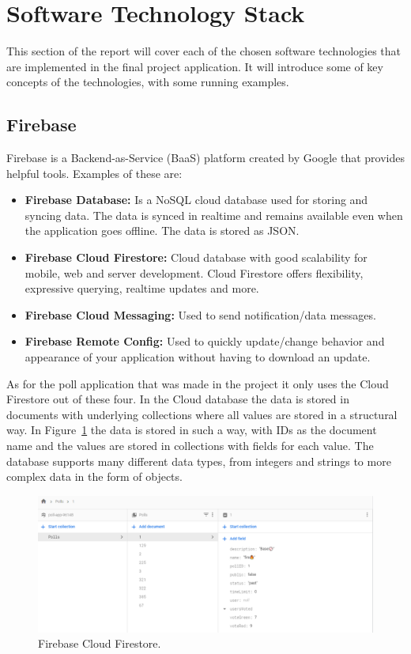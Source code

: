\section{Software Technology Stack}
\label{sec:technology}

This section of the report will cover each of the chosen software technologies that are implemented in the final project application. It will introduce some of key concepts of the technologies, with some running examples. 

\subsection{Firebase}
\label{sub:firebase}
Firebase is a Backend-as-Service (BaaS) platform created by Google that provides helpful tools. Examples of these are:

\begin{itemize}
 \item \textbf{Firebase Database:} Is a NoSQL cloud database used for storing and syncing data. The data is synced in realtime and remains available even when the application goes offline. The data is stored as JSON. \cite{firebasedb}
 \item \textbf{Firebase Cloud Firestore:} Cloud database with good scalability for mobile, web and server development. Cloud Firestore offers flexibility, expressive querying, realtime updates and more. \cite{firebasefs}
 \item \textbf{Firebase Cloud Messaging:} Used to send notification/data messages. \cite{firebasecm}
 \item \textbf{Firebase Remote Config:} Used to quickly update/change behavior and appearance of your application without having to download an update. \cite{firebaserc}
\end{itemize}
As for the poll application that was made in the project it only uses the Cloud Firestore out of these four. In the Cloud database the data is stored in documents with underlying collections where all values are stored in a structural way. In Figure~\ref{fig:fb} the data is stored in such a way, with IDs as the document name and the values are stored in collections with fields for each value. The database supports many different data types, from integers and strings to more complex data in the form of objects.
\begin{figure}[H]
  \centering
  \includegraphics[scale=0.4]{figs/fb.png}
  \caption[scale=0.5]{Firebase Cloud Firestore.}
  \label{fig:fb}
\end{figure}

